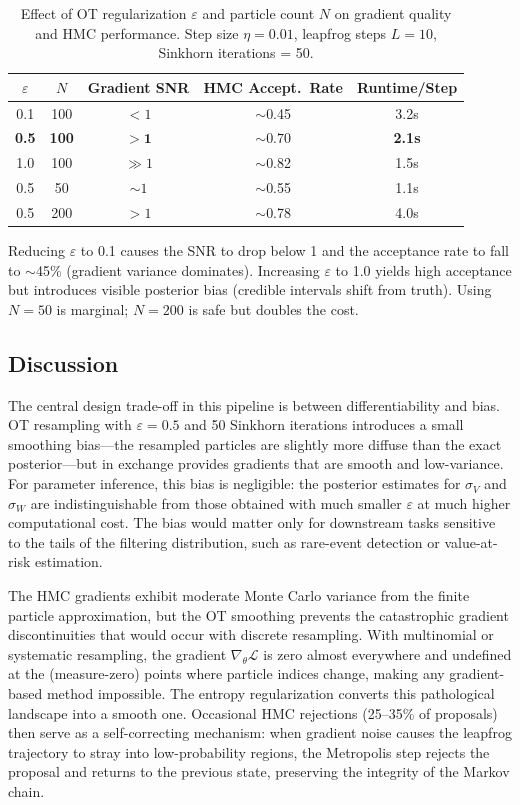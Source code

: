 \documentclass[12pt,a4paper]{article}
\theoremstyle{definition}
\theoremstyle{remark}
\begin{document}
\begin{table}[H]
	\centering
	\caption{Effect of OT regularization $\varepsilon$ and particle count $N$ on gradient quality and HMC performance. Step size $\eta = 0.01$, leapfrog steps $L = 10$, Sinkhorn iterations = 50.}
	\label{tab:gradient-tradeoffs}
	\begin{tabular}{@{}ccccc@{}}
		\toprule
		$\varepsilon$ & $N$ & Gradient SNR & HMC Accept.\ Rate & Runtime/Step \\
		\midrule
		0.1 & 100 & $< 1$ & $\sim$0.45 & 3.2s \\
		\textbf{0.5} & \textbf{100} & $\mathbf{> 1}$ & $\mathbf{\sim 0.70}$ & \textbf{2.1s} \\
		1.0 & 100 & $\gg 1$ & $\sim$0.82 & 1.5s \\
		0.5 & 50 & $\sim 1$ & $\sim$0.55 & 1.1s \\
		0.5 & 200 & $> 1$ & $\sim$0.78 & 4.0s \\
		\bottomrule
	\end{tabular}
\end{table}

\noindent Reducing $\varepsilon$ to 0.1 causes the SNR to drop below 1 and the acceptance rate to fall to $\sim$45\% (gradient variance dominates). Increasing $\varepsilon$ to 1.0 yields high acceptance but introduces visible posterior bias (credible intervals shift from truth). Using $N = 50$ is marginal; $N = 200$ is safe but doubles the cost.

\subsection{Discussion}

The central design trade-off in this pipeline is between differentiability and bias. OT resampling with $\varepsilon = 0.5$ and 50 Sinkhorn iterations introduces a small smoothing bias---the resampled particles are slightly more diffuse than the exact posterior---but in exchange provides gradients that are smooth and low-variance. For parameter inference, this bias is negligible: the posterior estimates for $\sigma_V$ and $\sigma_W$ are indistinguishable from those obtained with much smaller $\varepsilon$ at much higher computational cost. The bias would matter only for downstream tasks sensitive to the tails of the filtering distribution, such as rare-event detection or value-at-risk estimation.

The HMC gradients exhibit moderate Monte Carlo variance from the finite particle approximation, but the OT smoothing prevents the catastrophic gradient discontinuities that would occur with discrete resampling. With multinomial or systematic resampling, the gradient $\nabla_\theta \mathcal{L}$ is zero almost everywhere and undefined at the (measure-zero) points where particle indices change, making any gradient-based method impossible. The entropy regularization converts this pathological landscape into a smooth one. Occasional HMC rejections (25--35\% of proposals) then serve as a self-correcting mechanism: when gradient noise causes the leapfrog trajectory to stray into low-probability regions, the Metropolis step rejects the proposal and returns to the previous state, preserving the integrity of the Markov chain.
\end{document}
